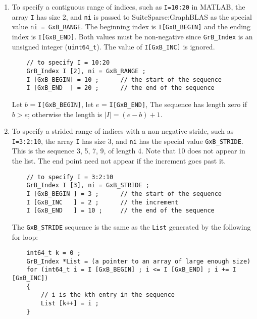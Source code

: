 \documentclass[12pt]{article}
\begin{document}
{\begin{enumerate}
\item To specify a contiguous range of indices, such as \verb'I=10:20'
    in MATLAB, the array \verb'I' has size 2, and \verb'ni' is passed to
    SuiteSparse:GraphBLAS as the special value \verb'ni = GxB_RANGE'.  The
    beginning index is \verb'I[GxB_BEGIN]' and the ending index is
    \verb'I[GxB_END]'.   Both values must be non-negative since
    \verb'GrB_Index' is an unsigned integer (\verb'uint64_t').  The value of
    \verb'I[GxB_INC]' is ignored.

    \vspace{-0.05in}
    {\footnotesize
    \begin{verbatim}
    // to specify I = 10:20
    GrB_Index I [2], ni = GxB_RANGE ;
    I [GxB_BEGIN] = 10 ;      // the start of the sequence
    I [GxB_END  ] = 20 ;      // the end of the sequence \end{verbatim}}

    \vspace{-0.05in}
    Let $b$ = \verb'I[GxB_BEGIN]', let $e$ = \verb'I[GxB_END]',
    The sequence has length zero if $b > e$; otherwise the length is
    $|I| = (e-b) + 1$.

\item To specify a strided range of indices with a non-negative stride,
    such as \verb'I=3:2:10', the array \verb'I' has size 3, and \verb'ni' has
    the special value \verb'GxB_STRIDE'.  This is the sequence 3, 5, 7, 9, of
    length 4.  Note that 10 does not appear in the list.  The end point need
    not appear if the increment goes past it.

    \vspace{-0.05in}
    {\footnotesize
    \begin{verbatim}
    // to specify I = 3:2:10
    GrB_Index I [3], ni = GxB_STRIDE ;
    I [GxB_BEGIN ] = 3 ;      // the start of the sequence
    I [GxB_INC   ] = 2 ;      // the increment
    I [GxB_END   ] = 10 ;     // the end of the sequence \end{verbatim}}

    \vspace{-0.05in}
    The \verb'GxB_STRIDE' sequence is the same as the \verb'List' generated by
    the following for loop:

    \vspace{-0.05in}
    {\footnotesize
    \begin{verbatim}
    int64_t k = 0 ;
    GrB_Index *List = (a pointer to an array of large enough size)
    for (int64_t i = I [GxB_BEGIN] ; i <= I [GxB_END] ; i += I [GxB_INC])
    {
        // i is the kth entry in the sequence
        List [k++] = i ;
    } \end{verbatim}}


\end{enumerate}}
\end{document}
